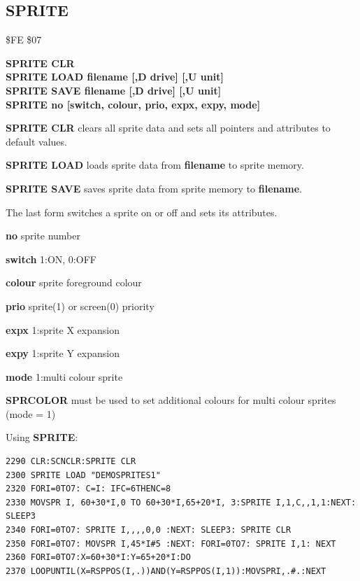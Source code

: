 \subsection{SPRITE}
\begin{description}[leftmargin=2cm,style=nextline]
\item [Token:] \$FE \$07
\item [Format:] {\bf SPRITE CLR} \\
                {\bf SPRITE LOAD filename [,D drive] [,U unit]} \\
                {\bf SPRITE SAVE filename [,D drive] [,U unit]} \\
                {\bf SPRITE no [switch, colour, prio, expx, expy, mode]}
\item [Usage:]  {\bf SPRITE CLR} clears all sprite data and sets all pointers
                and attributes to default values.

                {\bf SPRITE LOAD } loads sprite data from {\bf filename}
                to sprite memory.

                {\bf SPRITE SAVE } saves sprite data from
                sprite memory to {\bf filename}.

                \filenamedefinition

                The last form switches a sprite on or off and sets its attributes.

                {\bf no} sprite number

                {\bf switch} 1:ON, 0:OFF

                {\bf colour} sprite foreground colour

                {\bf prio} sprite(1) or screen(0) priority

                {\bf expx} 1:sprite X expansion

                {\bf expy} 1:sprite Y expansion

                {\bf mode} 1:multi colour sprite

\item [Remarks:] {\bf SPRCOLOR} must be used to set
                additional colours
                for multi colour sprites (mode = 1)

\item [Example:] Using {\bf SPRITE}:
\begin{tcolorbox}[colback=black,coltext=white]
\verbatimfont{\codefont}
\begin{verbatim}
2290 CLR:SCNCLR:SPRITE CLR
2300 SPRITE LOAD "DEMOSPRITES1"
2320 FORI=0TO7: C=I: IFC=6THENC=8
2330 MOVSPR I, 60+30*I,0 TO 60+30*I,65+20*I, 3:SPRITE I,1,C,,1,1:NEXT: SLEEP3
2340 FORI=0TO7: SPRITE I,,,,0,0 :NEXT: SLEEP3: SPRITE CLR
2350 FORI=0TO7: MOVSPR I,45*I#5 :NEXT: FORI=0TO7: SPRITE I,1: NEXT
2360 FORI=0TO7:X=60+30*I:Y=65+20*I:DO
2370 LOOPUNTIL(X=RSPPOS(I,.))AND(Y=RSPPOS(I,1)):MOVSPRI,.#.:NEXT
\end{verbatim}
\end{tcolorbox}
\end{description}

